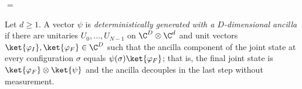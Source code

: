 \begin{center}
    \tenkzkernel
    \begin{tenkz}[rows={wire}, cols=1, bonds=none]
    \end{tenkz}
    \quad $=$ \quad
    \begin{tenkz}[rows={wire,wire}, cols=2, bonds=none, align=1]
    \end{tenkz}
\end{center}

\begin{definition}
    \label{def:seqanc_deterministic}
    \leanok
    Let $d\ge 1$. A vector $\psi$ is \emph{deterministically generated with a
        $D$-dimensional ancilla} if there are unitaries $U_0,\dots,U_{N-1}$ on
    $\C^D\otimes\C^d$ and unit vectors $\ket{\varphi_I},\ket{\varphi_F}\in\C^D$
    such that the ancilla component of the joint state at every
    configuration $\sigma$ equals $\psi(\sigma)\ket{\varphi_F}$; that is, the
    final joint state is $\ket{\varphi_F}\otimes\ket{\psi}$ and the ancilla
    decouples in the last step without measurement.
\end{definition}

